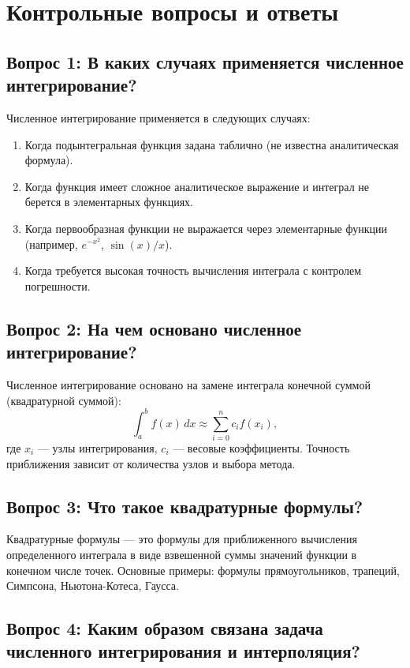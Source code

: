 \documentclass[a4paper,12pt]{article}
\begin{document}
\section*{Контрольные вопросы и ответы}

\subsection*{Вопрос 1: В каких случаях применяется численное интегрирование?}

Численное интегрирование применяется в следующих случаях:
\begin{enumerate}
    \item Когда подынтегральная функция задана таблично (не известна аналитическая формула).
    \item Когда функция имеет сложное аналитическое выражение и интеграл не берется в элементарных функциях.
    \item Когда первообразная функции не выражается через элементарные функции (например, $e^{-x^2}$, $\sin(x)/x$).
    \item Когда требуется высокая точность вычисления интеграла с контролем погрешности.
\end{enumerate}

\subsection*{Вопрос 2: На чем основано численное интегрирование?}

Численное интегрирование основано на замене интеграла конечной суммой (квадратурной суммой):
\[
\int_a^b f(x)\,dx \approx \sum_{i=0}^{n} c_i f(x_i),
\]
где $x_i$ --- узлы интегрирования, $c_i$ --- весовые коэффициенты. Точность приближения зависит от количества узлов и выбора метода.

\subsection*{Вопрос 3: Что такое квадратурные формулы?}

Квадратурные формулы --- это формулы для приближенного вычисления определенного интеграла в виде взвешенной суммы значений функции в конечном числе точек. Основные примеры: формулы прямоугольников, трапеций, Симпсона, Ньютона-Котеса, Гаусса.

\subsection*{Вопрос 4: Каким образом связана задача численного интегрирования и интерполяция?}
\end{document}
